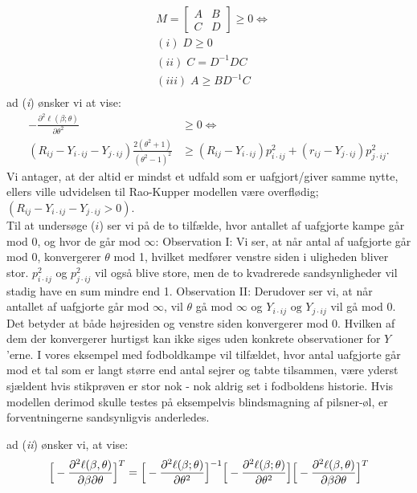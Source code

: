 \documentclass[11pt,a4paper]{article}
\begin{document}
\begin{align*}
&M = \begin{bmatrix}
A & B\\
C & D
\end{bmatrix}\geq 0 \iff \\
&(i)\; D\geq0\\
&(ii)\; C=D^{-1}DC\\
&(iii)\; A\geq BD^{-1}C\\
\end{align*}  
ad (\textit{i}) ønsker vi at vise: 
\begin{align*}
-\frac{\partial^2 \ell(\beta;\theta)}{\partial \theta^2} &\geq 0 \iff \\ (R_{ij}- Y_{i\cdot ij}-Y_{j\cdot ij}) \frac{2(\theta^2+1)}{(\theta^2-1)^2} &\geq (R_{ij}-Y_{i\cdot ij})p_{i\cdot ij}^2 + (r_{ij}-Y_{j\cdot ij})p_{j\cdot ij}^2.
\end{align*}
Vi antager, at der altid er mindst et udfald som er uafgjort/giver samme nytte, ellers ville udvidelsen til Rao-Kupper modellen være overflødig; $(R_{ij}- Y_{i\cdot ij}-Y_{j\cdot ij} > 0)$.\\
Til at undersøge ($i$) ser vi på de to tilfælde, hvor antallet af uafgjorte kampe går mod 0, og hvor de går mod $\infty$:
\newline Observation I: Vi ser, at når antal af uafgjorte går mod 0, konvergerer $\theta$ mod 1, hvilket medfører venstre siden i uligheden bliver stor. $p_{i\cdot ij}^2$ og $p_{j\cdot ij}^2$ vil også blive store, men de to kvadrerede sandsynligheder vil stadig have en sum mindre end 1.
\newline Observation II: Derudover ser vi, at når antallet af uafgjorte går mod $\infty$, vil $\theta$ gå mod $\infty$ og $Y_{i \cdot ij} \text{ og } Y_{j \cdot ij}$ vil gå mod 0. Det betyder at både højresiden og venstre siden konvergerer mod 0. Hvilken af dem der konvergerer hurtigst kan ikke siges uden konkrete observationer for $Y$'erne. I vores eksempel med fodboldkampe vil tilfældet, hvor antal uafgjorte går mod et tal som er langt større end antal sejrer og tabte tilsammen, være yderst sjældent hvis stikprøven er stor nok - nok aldrig set i fodboldens historie. Hvis modellen derimod skulle testes på eksempelvis blindsmagning af pilsner-øl, er forventningerne sandsynligvis anderledes.\newline \par
ad (\textit{ii}) ønsker vi, at vise:
\begin{align*}
\Big{[}-\frac{\partial^2 \ell(\beta,\theta)}{\partial \beta \partial \theta}\Big{]}^T = \Big{[}-\frac{\partial^2 \ell(\beta;\theta)}{\partial \theta^2}\Big{]}^{-1}\Big{[}-\frac{\partial^2 \ell(\beta;\theta)}{\partial \theta^2}\Big{]}\Big{[}-\frac{\partial^2 \ell(\beta,\theta)}{\partial \beta \partial \theta}\Big{]}^T
\end{align*}
\end{document}

